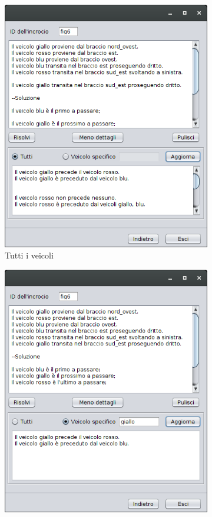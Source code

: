 \begin{figure}[!htb]
	\centering
	\begin{subfigure}[b]{.4\textwidth}
		\includegraphics[width=\textwidth]{images/gui/solve_gui2}
		\caption{Tutti i veicoli}
	\end{subfigure}
	\begin{subfigure}[b]{.4\textwidth}
		\includegraphics[width=\textwidth]{images/gui/solve_gui3}

\end{subfigure}
\end{figure}
